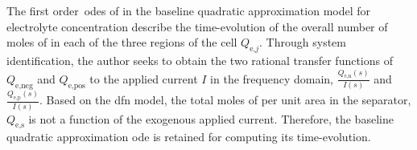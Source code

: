 
The                  first                 order~\glspl{ode}                  of
 in the baseline
quadratic  approximation  model  for   electrolyte  concentration  describe  the
time-evolution of the overall number of moles  of  in each of the three
regions of the cell $Q_{\text{e,}j}$.  Through system identification, the author
seeks  to obtain  the two  rational transfer  functions of  $Q_\text{e,neg}$ and
$Q_\text{e,pos}$  to the  applied current  $I$  in the  frequency domain,  \ie{}
$\frac{Q_\text{e,n}(s)}{I(s)}$ and $\frac{Q_\text{e,p}(s)}{I(s)}$.  Based on the
\gls{dfn} model,  the total moles of   per unit area  in the separator,
$Q_\text{e,s}$ is  not a function  of the exogenous applied  current. Therefore,
the baseline  quadratic approximation  \gls{ode} is  retained for  computing its
time-evolution.

